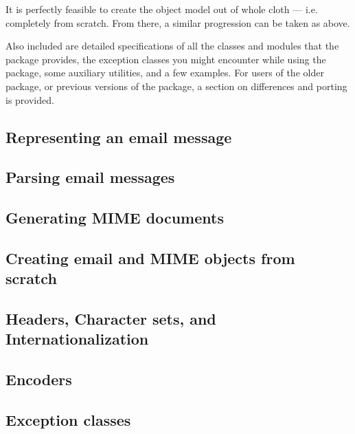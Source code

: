 It is perfectly feasible to create the object model out of whole cloth
--- i.e. completely from scratch.  From there, a similar progression
can be taken as above.  

Also included are detailed specifications of all the classes and
modules that the  package provides, the exception
classes you might encounter while using the  package,
some auxiliary utilities, and a few examples.  For users of the older
 package, or previous versions of the 
package, a section on differences and porting is provided.

\begin{seealso}
\end{seealso}

\subsection{Representing an email message}


\subsection{Parsing email messages}


\subsection{Generating MIME documents}


\subsection{Creating email and MIME objects from scratch}


\subsection{Headers, Character sets, and Internationalization}


\subsection{Encoders}


\subsection{Exception classes}


